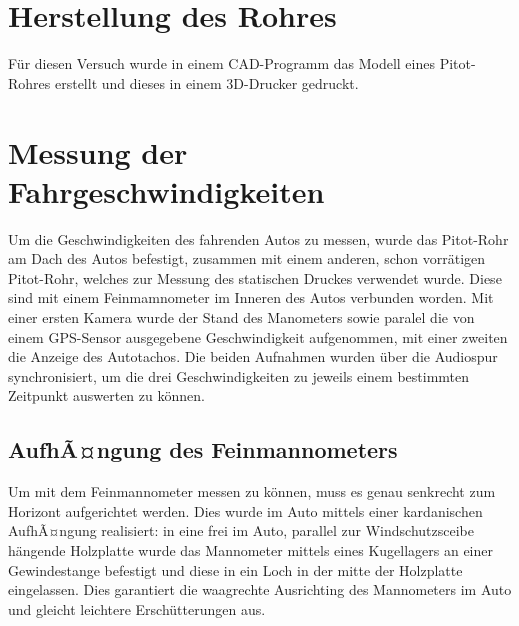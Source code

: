 \section{Herstellung des Rohres}
Für diesen Versuch wurde in einem CAD-Programm das Modell eines Pitot-Rohres erstellt und dieses in einem 3D-Drucker gedruckt.

\section{Messung der Fahrgeschwindigkeiten}
Um die Geschwindigkeiten des fahrenden Autos zu messen, wurde das Pitot-Rohr am Dach des Autos befestigt, zusammen mit einem anderen, schon vorrätigen Pitot-Rohr, welches zur Messung des statischen Druckes verwendet wurde. Diese sind mit einem Feinmamnometer im Inneren des Autos verbunden worden. Mit einer ersten Kamera wurde der Stand des Manometers sowie paralel die von einem GPS-Sensor ausgegebene Geschwindigkeit aufgenommen, mit einer zweiten die Anzeige des Autotachos. Die beiden Aufnahmen wurden über die Audiospur synchronisiert, um die drei Geschwindigkeiten zu jeweils einem bestimmten Zeitpunkt auswerten zu können.

\subsection{AufhÃ¤ngung des Feinmannometers}
Um mit dem Feinmannometer messen zu können, muss es genau senkrecht zum Horizont aufgerichtet werden. Dies wurde im Auto mittels einer kardanischen AufhÃ¤ngung realisiert: in eine frei im Auto, parallel zur Windschutzsceibe hängende Holzplatte wurde das Mannometer mittels eines Kugellagers an einer Gewindestange befestigt und diese in ein Loch in der mitte der Holzplatte eingelassen. Dies garantiert die waagrechte Ausrichting des Mannometers im Auto und gleicht leichtere Erschütterungen aus. 
